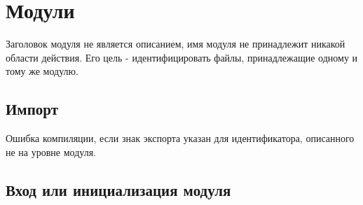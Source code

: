 \hypertarget{modules}{%
\section{Модули}\label{mods:chapter}}

Заголовок модуля не является описанием, имя модуля не принадлежит никакой области действия. Его цель - идентифицировать файлы, принадлежащие одному и тому же модулю.

\hypertarget{import}{%
\subsection{Импорт}\label{mods:import}}

Ошибка компиляции, если знак экспорта указан для идентификатора, описанного не на уровне модуля.

\hypertarget{entry}{%
\subsection{Вход или инициализация модуля}\label{mods:entry}}

